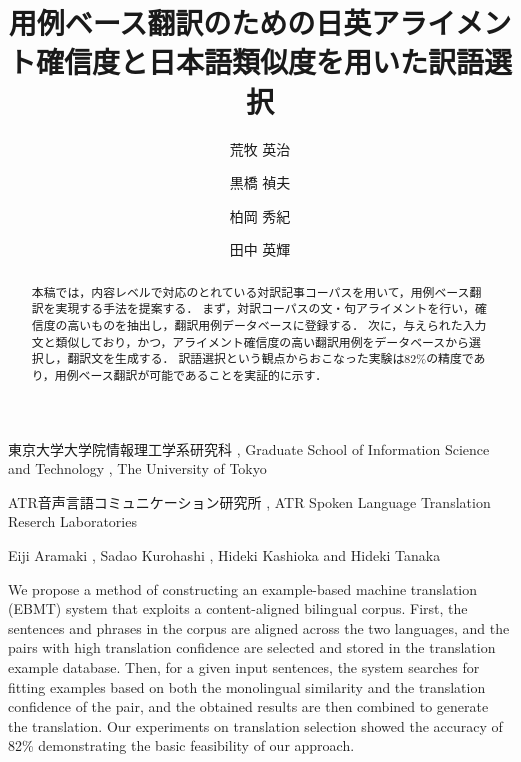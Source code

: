 \documentclass{nlp}
\begin{document}
\setcounter{page}{107}
\setcounter{Volume}{11}
\setcounter{Number}{1}
\setcounter{Year}{2004} 
\setcounter{Month}{1}


\title{用例ベース翻訳のための日英アライメント確信度と日本語類似度を用いた訳語選択}

\author{荒牧 英治 \and 黒橋 禎夫 \and 柏岡 秀紀 \and 田中 英輝}




{
	東京大学大学院情報理工学系研究科
	, Graduate School of Information Science and Technology
	, The University of Tokyo
}

{
	ATR音声言語コミュニケーション研究所
	, ATR Spoken Language Translation Reserch Laboratories\\
}

\begin{abstract}

本稿では，内容レベルで対応のとれている対訳記事コーパスを用いて，用例ベース翻訳を実現する手法を提案する．
まず，対訳コーパスの文・句アライメントを行い，確信度の高いものを抽出し，翻訳用例データベースに登録する．
次に，与えられた入力文と類似しており，かつ，アライメント確信度の高い翻訳用例をデータベースから選択し，翻訳文を生成する．
訳語選択という観点からおこなった実験は82\%の精度であり，用例ベース翻訳が可能であることを実証的に示す．
\end{abstract}






\eauthor
{
	Eiji Aramaki	 {\hspace*{-6pt}\rm ,}
	Sadao Kurohashi	 {\hspace*{-6pt}\rm ,}
	Hideki Kashioka	 {\hspace*{-6pt}\rm and}
	Hideki Tanaka	
}

\begin{eabstract}
We propose a method of constructing an example-based machine translation (EBMT) system that exploits a content-aligned bilingual corpus.
First, the sentences and phrases in the corpus are aligned across the two languages, and the pairs with high translation confidence are selected and stored in the translation example database.
Then, for a given input sentences, the system searches for fitting examples based on both the monolingual similarity and the translation confidence of the pair, and the obtained results are then combined to generate the translation.
Our experiments on translation selection showed the accuracy of 82\% demonstrating the basic feasibility of our approach.
\end{eabstract}
\end{document}
